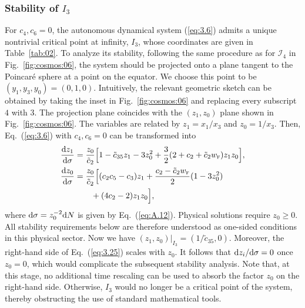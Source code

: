 \documentclass[aps,prd,twocolumn]{revtex4-2}
\newcommand\dx{{\rm d}}
\newcommand\subF{\textsc{f}}
\begin{document}
\subsubsection{Stability of $I_3$}\label{sec:III.C.1}
For $c_4,c_6=0$, the autonomous dynamical system (\ref{eq:3.6}) admits a unique nontrivial critical point at infinity, $I_3$, whose coordinates are given in Table~\ref{tab:02}. To analyze its stability, following the same procedure as for $\mathcal{I}_4$ in Fig.~\ref{fig:cosmos:06}, the system should be projected onto a plane tangent to the Poincar\'e sphere at a point on the equator. We choose this point to be $(y_1,y_3,y_0)=(0,1,0)$. Intuitively, the relevant geometric sketch can be obtained by taking the inset in Fig.~\ref{fig:cosmos:06} and replacing every subscript $4$ with $3$. The projection plane coincides with the $(z_1,z_0)$ plane shown in Fig.~\ref{fig:cosmos:06}. The variables are related by $z_1=x_1/x_3$ and $z_0=1/x_3$. Then, Eq.~(\ref{eq:3.6}) with $c_4,c_6=0$ can be transformed into
\begin{subequations}\label{eq:3.25}
\begin{align}
  \frac{\dx z_1}{\dx\sigma} &= \frac{z_0}{\tilde{c}_2}\Big[1 - \tilde{c}_{35}z_1 - 3z_0^2 + \frac{3}{2}(2+c_2+\tilde{c}_2w_\subF)z_1z_0\Big], \label{eq:3.25a} \\
  \frac{\dx z_0}{\dx\sigma} &= \frac{z_0}{\tilde{c}_2}\Big[(c_2c_5-c_3)z_1 + \frac{c_2-\tilde{c}_2w_\subF}{2}(1-3z_0^2) \nonumber\\
    &\qquad + (4c_2-2)z_1z_0\Big], \label{eq:3.25b}
\end{align}
\end{subequations}
where $\dx\sigma=z_0^{-2} \dx N$ is given by Eq.~(\ref{eq:A.12}). Physical solutions require $z_0\geqslant0$. All stability requirements below are therefore understood as one-sided conditions in this physical sector. Now we have $(z_1,z_0)|_{I_3} = (1/\tilde{c}_{35},0)$. Moreover, the right-hand side of Eq.~(\ref{eq:3.25}) scales with $z_0$. It follows that $\dx z_i/\dx\sigma=0$ once $z_0=0$, which would complicate the subsequent stability analysis. Note that, at this stage, no additional time rescaling can be used to absorb the factor $z_0$ on the right-hand side. Otherwise, $I_3$ would no longer be a critical point of the system, thereby obstructing the use of standard mathematical tools.
\end{document}
